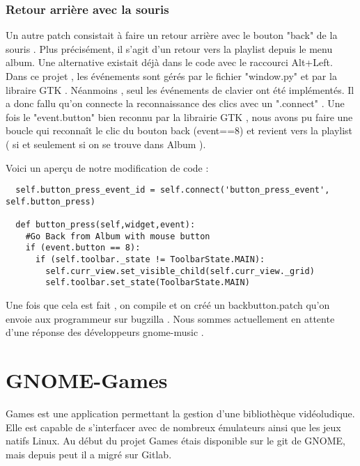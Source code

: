\documentclass[12pt]{report}
\begin{document}
\subsection{Retour arrière avec la souris}
Un autre patch consistait à faire un retour arrière avec le bouton "back" de la souris . Plus précisément, il s'agit d'un retour vers la playlist depuis le menu album.
Une alternative existait déjà dans le code avec le raccourci Alt+Left. Dans ce projet , les événements sont gérés par le fichier "window.py" et par la libraire GTK . Néanmoins , seul les événements de clavier ont été implémentés. Il a donc fallu qu'on connecte la reconnaissance des clics avec un ".connect" . Une fois le "event.button" bien reconnu par la librairie GTK , nous avons pu faire une boucle qui reconnaît le clic du bouton back (event==8) et revient vers la playlist ( si et seulement si on se trouve dans Album ).

Voici un aperçu de notre modification de code : 

\begin{verbatim}
  self.button_press_event_id = self.connect('button_press_event', self.button_press)

  def button_press(self,widget,event):
    #Go Back from Album with mouse button 
    if (event.button == 8):
      if (self.toolbar._state != ToolbarState.MAIN):
        self.curr_view.set_visible_child(self.curr_view._grid)
        self.toolbar.set_state(ToolbarState.MAIN)
\end{verbatim}

Une fois que cela est fait , on compile et on créé un backbutton.patch qu'on envoie aux programmeur sur bugzilla . 
Nous sommes actuellement en attente d'une réponse des développeurs gnome-music . 

\newpage
\chapter{GNOME-Games} %
Games est une application permettant la gestion d'une
bibliothèque vidéoludique. Elle est capable de s'interfacer avec de
nombreux émulateurs ainsi que les jeux natifs Linux. Au début du
projet Games étais disponible sur le git de GNOME, mais depuis peut il
a migré sur Gitlab.
\end{document}
